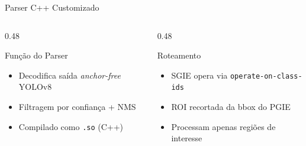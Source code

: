 \begin{frame}{Parser C++ Customizado}
\begin{center}
{\begin{tikzpicture}
  \end{tikzpicture}
  }
  \end{center}

  \vspace{1mm}

  \begin{columns}[t]
    \begin{column}{0.48\textwidth}
      \begin{block}{\scriptsize Função do Parser}
        \begin{itemize}\scriptsize
          \setlength{\itemsep}{0pt}
          \item Decodifica saída \textit{anchor-free} YOLOv8
          \item Filtragem por confiança + NMS
          \item Compilado como \texttt{.so} (C++)
        \end{itemize}
      \end{block}
    \end{column}
    \begin{column}{0.48\textwidth}
      \begin{block}{\scriptsize Roteamento}
        \begin{itemize}\scriptsize
          \setlength{\itemsep}{0pt}
          \item SGIE opera via \texttt{operate-on-class-ids}
          \item ROI recortada da bbox do PGIE
          \item Processam apenas regiões de interesse
        \end{itemize}
      \end{block}
    \end{column}
  \end{columns}
  \vfill
\end{frame}

